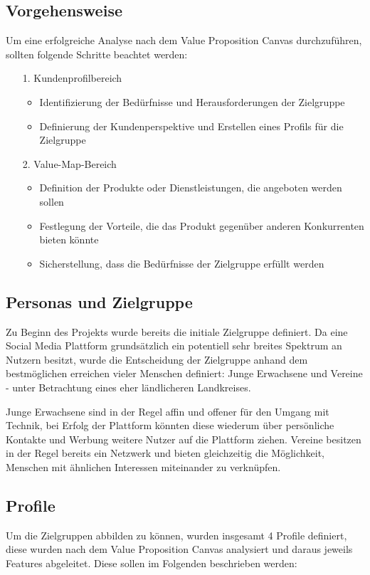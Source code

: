 \subsection*{Vorgehensweise}

Um eine erfolgreiche Analyse nach dem Value Proposition Canvas durchzuführen, sollten folgende Schritte beachtet werden:

\begin{itemize}
    \item[1.] Kundenprofilbereich 
    \begin{itemize}
        \item Identifizierung der Bedürfnisse und Herausforderungen der Zielgruppe
        \item Definierung der Kundenperspektive und Erstellen eines Profils für die Zielgruppe
    \end{itemize}
    \item[2.] Value-Map-Bereich
    \begin{itemize}
            \item Definition der Produkte oder Dienstleistungen, die angeboten werden sollen
            \item Festlegung der Vorteile, die das Produkt gegenüber anderen Konkurrenten bieten könnte
            \item Sicherstellung, dass die Bedürfnisse der Zielgruppe erfüllt werden
    \end{itemize}
\end{itemize}

\subsection{Personas und Zielgruppe}
Zu Beginn des Projekts wurde bereits die initiale Zielgruppe definiert. Da eine Social Media Plattform grundsätzlich ein potentiell sehr breites Spektrum an Nutzern besitzt, wurde die Entscheidung der Zielgruppe anhand dem bestmöglichen erreichen vieler Menschen definiert: Junge Erwachsene und Vereine - unter Betrachtung eines eher ländlicheren Landkreises.

Junge Erwachsene sind in der Regel affin und offener für den Umgang mit Technik, bei Erfolg der Plattform könnten diese wiederum über persönliche Kontakte und Werbung weitere Nutzer auf die Plattform ziehen. Vereine besitzen in der Regel bereits ein Netzwerk und bieten gleichzeitig die Möglichkeit, Menschen mit ähnlichen Interessen miteinander zu verknüpfen.

\subsection{Profile}
Um die Zielgruppen abbilden zu können, wurden insgesamt 4 Profile definiert, diese wurden nach dem Value Proposition Canvas analysiert und daraus jeweils Features abgeleitet. Diese sollen im Folgenden beschrieben werden:
